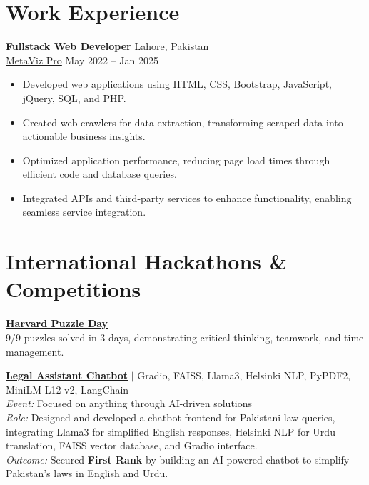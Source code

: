 \documentclass[a4paper,12pt]{article}
\begin{document}
\section{Work Experience}

\textbf{Fullstack Web Developer} \hfill Lahore, Pakistan \\
\href{https://metaviz.pro/}{MetaViz Pro} \hfill May 2022 -- Jan 2025

\begin{itemize}[leftmargin=*]
    \item Developed web applications using HTML, CSS, Bootstrap, JavaScript, jQuery, SQL, and PHP.
    \item Created web crawlers for data extraction, transforming scraped data into actionable business insights.
    \item Optimized application performance, reducing page load times through efficient code and database queries.
    \item Integrated APIs and third-party services to enhance functionality, enabling seamless service integration.
\end{itemize}

\section{International Hackathons \& Competitions}

\textbf{\href{https://www.linkedin.com/posts/muhammad-qasim-gill_cs50-harvard-puzzleday2025-activity-7316559580790972418-4B6G?utm_source=share&utm_medium=member_desktop&rcm=ACoAACG6gOwBnlfoWP0KSUXYMZV0hE4WXwmWsBQ}{Harvard Puzzle Day}} \\
9/9 puzzles solved in 3 days, demonstrating critical thinking, teamwork, and time management.

\vspace{0.5em}

\textbf{\href{https://www.linkedin.com/feed/update/urn:li:activity:7304649229472309248/}{Legal Assistant Chatbot}} 
$|$ Gradio, FAISS, Llama3, Helsinki NLP, PyPDF2, MiniLM-L12-v2, LangChain \\
\textit{Event:} Focused on anything through AI-driven solutions \\
\textit{Role:} Designed and developed a chatbot frontend for Pakistani law queries, integrating Llama3 for simplified English responses, Helsinki NLP for Urdu translation, FAISS vector database, and Gradio interface. \\
\textit{Outcome:} Secured \textbf{First Rank} by building an AI-powered chatbot to simplify Pakistan’s laws in English and Urdu.
\end{document}
